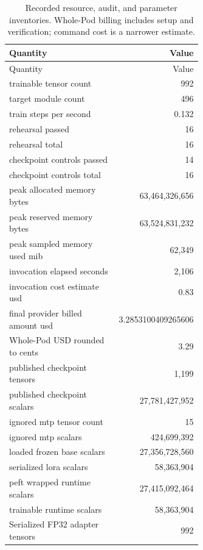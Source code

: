 \begingroup\small
\begin{longtable}{p{0.63\linewidth}r}
\caption{Recorded resource, audit, and parameter inventories. Whole-Pod billing includes setup and verification; command cost is a narrower estimate.}\label{tab:generated-resources}\\
\toprule
Quantity & Value \\
\midrule\endfirsthead
\toprule
Quantity & Value \\
\midrule\endhead
trainable tensor count & 992 \\
target module count & 496 \\
train steps per second & 0.132 \\
rehearsal passed & 16 \\
rehearsal total & 16 \\
checkpoint controls passed & 14 \\
checkpoint controls total & 16 \\
peak allocated memory bytes & 63,464,326,656 \\
peak reserved memory bytes & 63,524,831,232 \\
peak sampled memory used mib & 62,349 \\
invocation elapsed seconds & 2,106 \\
invocation cost estimate usd & 0.83 \\
final provider billed amount usd & 3.2853100409265606 \\
Whole-Pod USD rounded to cents & 3.29 \\
published checkpoint tensors & 1,199 \\
published checkpoint scalars & 27,781,427,952 \\
ignored mtp tensor count & 15 \\
ignored mtp scalars & 424,699,392 \\
loaded frozen base scalars & 27,356,728,560 \\
serialized lora scalars & 58,363,904 \\
peft wrapped runtime scalars & 27,415,092,464 \\
trainable runtime scalars & 58,363,904 \\
Serialized FP32 adapter tensors & 992 \\
\bottomrule\end{longtable}\endgroup
